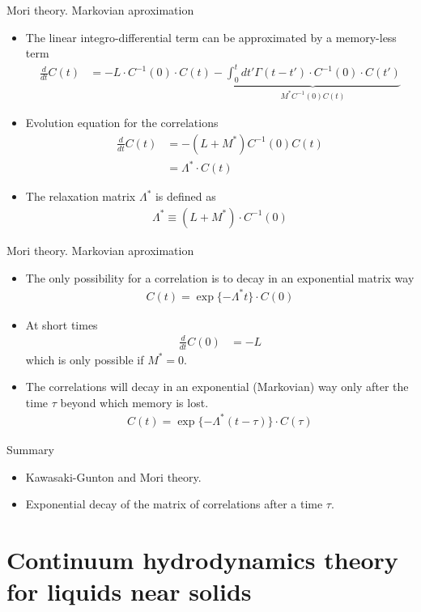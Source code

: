 \documentclass{beamer}
\newcommand{\esc}{\!\cdot\!}
\begin{document}
\begin{frame}{Mori theory. Markovian aproximation}
  \begin{itemize}
    \item The linear integro-differential term can be approximated by a memory-less term
      \begin{align}
  \frac{d}{dt}C(t)&=-L\esc C^{-1}(0)\esc C(t)
  -\underbrace{\int_0^tdt' \Gamma(t-t')\esc C^{-1}(0)\esc  C(t')}_{M^* C^{-1}(0)C(t)}
\nonumber
\end{align}
\item Evolution equation for the correlations
\begin{align}
  \frac{d}{dt}C(t)&=-(L+M^*)C^{-1}(0)C(t) 
  \nonumber \\
  &= \Lambda^*\esc  C(t)
\nonumber
\end{align}
\item The \alert{relaxation matrix} $\Lambda^*$ is defined as
\begin{align}
\Lambda^*\equiv(L+M^*)\esc C^{-1}(0)  
\nonumber
\end{align}
\end{itemize}
\end{frame}

\begin{frame}{Mori theory. Markovian aproximation}
  \begin{itemize}
    \item  The only possibility for a correlation is to \alert{decay in an exponential matrix way} 
\begin{align}
  C(t)=\exp\{-\Lambda^* t\}\esc C(0)
\nonumber
\end{align}
\item At short times 
\begin{align}
    \frac{d}{dt}C(0)&=-L
  \nonumber
\end{align}
which is only possible if $M^*=0$.
\item The correlations  will decay  in an
  exponential (Markovian)  way only  after the  time $\tau$  beyond which
memory is lost. 
\begin{align}
  C(t)=\exp\{-\Lambda^* (t-\tau)\}\esc C(\tau)
\nonumber
\end{align}
\end{itemize}
\end{frame}

\begin{frame}{Summary}
  \begin{itemize}
    \item Kawasaki-Gunton and Mori theory. 
    \item Exponential decay of the matrix of correlations after a time $\tau$.
    \end{itemize}
\end{frame}

\section{Continuum hydrodynamics theory for liquids near solids}
\end{document}
